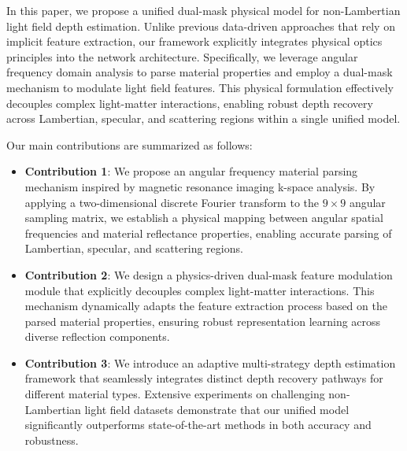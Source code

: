 In this paper, we propose a unified dual-mask physical model for non-Lambertian light field depth estimation. Unlike previous data-driven approaches that rely on implicit feature extraction, our framework explicitly integrates physical optics principles into the network architecture. Specifically, we leverage angular frequency domain analysis to parse material properties and employ a dual-mask mechanism to modulate light field features. This physical formulation effectively decouples complex light-matter interactions, enabling robust depth recovery across Lambertian, specular, and scattering regions within a single unified model.

Our main contributions are summarized as follows:

\begin{itemize}
  \item \textbf{Contribution 1}: We propose an angular frequency material parsing mechanism inspired by magnetic resonance imaging k-space analysis. By applying a two-dimensional discrete Fourier transform to the $9 \times 9$ angular sampling matrix, we establish a physical mapping between angular spatial frequencies and material reflectance properties, enabling accurate parsing of Lambertian, specular, and scattering regions.
  \item \textbf{Contribution 2}: We design a physics-driven dual-mask feature modulation module that explicitly decouples complex light-matter interactions. This mechanism dynamically adapts the feature extraction process based on the parsed material properties, ensuring robust representation learning across diverse reflection components.
  \item \textbf{Contribution 3}: We introduce an adaptive multi-strategy depth estimation framework that seamlessly integrates distinct depth recovery pathways for different material types. Extensive experiments on challenging non-Lambertian light field datasets demonstrate that our unified model significantly outperforms state-of-the-art methods in both accuracy and robustness.
\end{itemize}